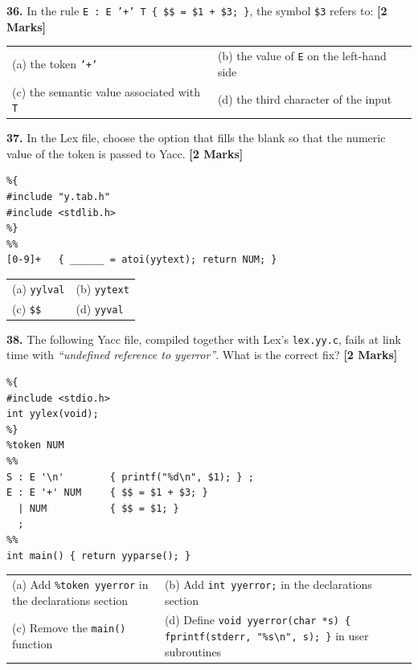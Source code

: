 \documentclass[11pt,a4paper]{article}
\begin{document}
\vspace{0.22cm}

\noindent \textbf{36.} In the rule \texttt{E : E '+' T \{ \$\$ = \$1 + \$3; \}}, the symbol \texttt{\$3} refers to: \hfill \textbf{[2 Marks]}
\vspace{0.06cm}
\noindent
\begin{tabularx}{\textwidth}{@{}X X@{}}
(a) the token \texttt{'+'} & (b) the value of \texttt{E} on the left-hand side \\[3pt]
(c) the semantic value associated with \texttt{T} & (d) the third character of the input \\
\end{tabularx}

\vspace{0.22cm}

\noindent \textbf{37.} In the Lex file, choose the option that fills the blank so that the numeric value of the token is passed to Yacc. \hfill \textbf{[2 Marks]}
\begin{lstlisting}
%{
#include "y.tab.h"
#include <stdlib.h>
%}
%%
[0-9]+   { ______ = atoi(yytext); return NUM; }
\end{lstlisting}
\vspace{0.06cm}
\noindent
\begin{tabularx}{\textwidth}{@{}X X@{}}
(a) \texttt{yylval} & (b) \texttt{yytext} \\[3pt]
(c) \texttt{\$\$} & (d) \texttt{yyval} \\
\end{tabularx}

\vspace{0.22cm}

\noindent \textbf{38.} The following Yacc file, compiled together with Lex's \texttt{lex.yy.c}, fails at link time with \emph{``undefined reference to yyerror''}. What is the correct fix? \hfill \textbf{[2 Marks]}
\begin{lstlisting}
%{
#include <stdio.h>
int yylex(void);
%}
%token NUM
%%
S : E '\n'        { printf("%d\n", $1); } ;
E : E '+' NUM     { $$ = $1 + $3; }
  | NUM           { $$ = $1; }
  ;
%%
int main() { return yyparse(); }
\end{lstlisting}
\vspace{0.06cm}
\noindent
\begin{tabularx}{\textwidth}{@{}X X@{}}
(a) Add \texttt{\%token yyerror} in the declarations section & (b) Add \texttt{int yyerror;} in the declarations section \\[3pt]
(c) Remove the \texttt{main()} function & (d) Define \texttt{void yyerror(char *s) \{ fprintf(stderr, "\%s\textbackslash n", s); \}} in user subroutines \\
\end{tabularx}
\end{document}
